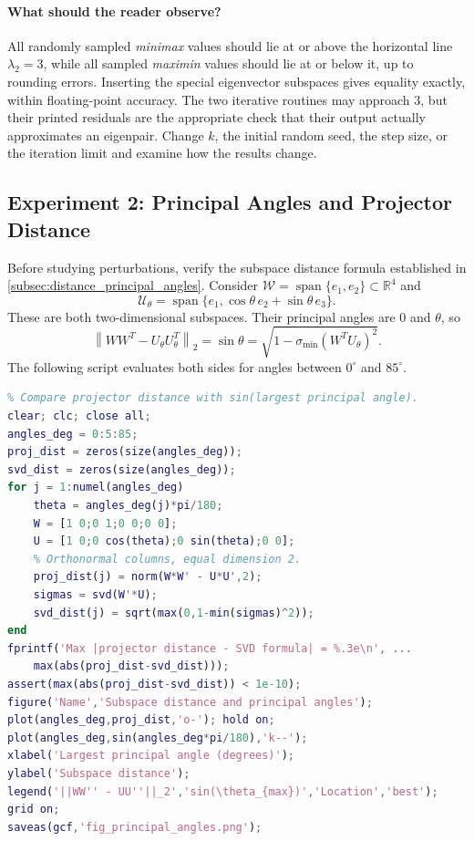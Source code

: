 \documentclass[14pt,letterpaper]{article}
\theoremstyle{plain}
\theoremstyle{definition}
\theoremstyle{remark}
\newcommand{\R}{\mathbb{R}}
\newcommand{\norm}[1]{\left\lVert #1 \right\rVert}
\DeclareMathOperator{\Span}{span}
\begin{document}
\paragraph{What should the reader observe?}
All randomly sampled \emph{minimax} values should lie
at or above the horizontal line $\lambda_2=3$, while
all sampled \emph{maximin} values should lie at or
below it, up to rounding errors. Inserting the
special eigenvector subspaces gives equality exactly,
within floating-point accuracy. The two iterative
routines may approach $3$, but their printed residuals
are the appropriate check that their output actually
approximates an eigenpair. Change $k$, the initial
random seed, the step size, or the iteration limit
and examine how the results change.

\subsection{Experiment 2: Principal Angles and Projector Distance}
\label{subsec:matlab_angles}

Before studying perturbations, verify the subspace
distance formula established in
\cref{subsec:distance_principal_angles}. Consider
$\mathcal W=\Span\{e_1,e_2\}\subset\R^4$ and
\[
\mathcal U_\theta
=\Span\{e_1,\cos\theta\,e_2+\sin\theta\,e_3\}.
\]
These are both two-dimensional subspaces. Their
principal angles are $0$ and $\theta$, so
\[
\boxed{
\norm{WW^T-U_\theta U_\theta^T}_2
=\sin\theta
=\sqrt{1-\sigma_{\min}(W^TU_\theta)^2}.
}
\]
The following script evaluates both sides for angles
between $0^\circ$ and $85^\circ$.

\begin{lstlisting}[language=Matlab,caption={Experiment 2: projector distance and principal angles.},label={lst:experiment_angles}]
% experiment_principal_angles.m
% Compare projector distance with sin(largest principal angle).
clear; clc; close all;
angles_deg = 0:5:85;
proj_dist = zeros(size(angles_deg));
svd_dist = zeros(size(angles_deg));
for j = 1:numel(angles_deg)
    theta = angles_deg(j)*pi/180;
    W = [1 0;0 1;0 0;0 0];
    U = [1 0;0 cos(theta);0 sin(theta);0 0];
    % Orthonormal columns, equal dimension 2.
    proj_dist(j) = norm(W*W' - U*U',2);
    sigmas = svd(W'*U);
    svd_dist(j) = sqrt(max(0,1-min(sigmas)^2));
end
fprintf('Max |projector distance - SVD formula| = %.3e\n', ...
    max(abs(proj_dist-svd_dist)));
assert(max(abs(proj_dist-svd_dist)) < 1e-10);
figure('Name','Subspace distance and principal angles');
plot(angles_deg,proj_dist,'o-'); hold on;
plot(angles_deg,sin(angles_deg*pi/180),'k--');
xlabel('Largest principal angle (degrees)');
ylabel('Subspace distance');
legend('||WW'' - UU''||_2','sin(\theta_{max})','Location','best');
grid on;
saveas(gcf,'fig_principal_angles.png');
\end{lstlisting}
\end{document}
